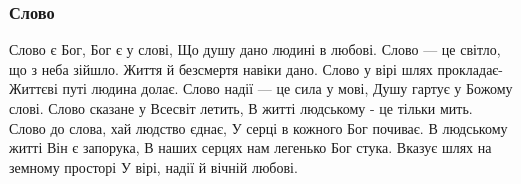  
 
 

\subsubsection{Слово}

Слово є Бог, Бог є у слові,
Що душу дано людині в любові.
Слово — це світло, що з неба зійшло.
Життя й безсмертя навіки дано.
Слово у вірі шлях прокладає-
Життєві путі людина долає.
Слово надії — це сила у мові,
Душу гартує у Божому слові.
Слово сказане у Всесвіт летить,
В житті людському - це тільки мить.
Слово до слова, хай людство єднає,
У серці в кожного Бог почиває.
В людському житті Він є запорука,
В наших серцях нам легенько Бог стука.
Вказує шлях на земному просторі
У вірі, надії й вічній любові. 
